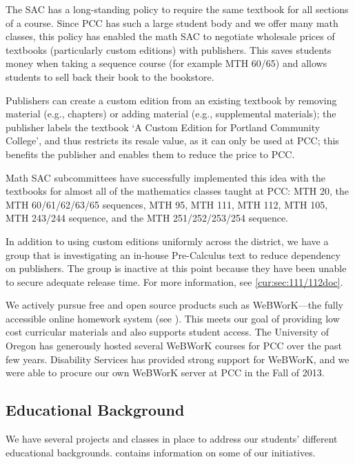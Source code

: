 The SAC has a long-standing policy to require the same textbook for all sections of a course. Since PCC has such a large student body and we offer many math classes, this policy has enabled the math SAC to negotiate wholesale prices of textbooks (particularly custom editions) with publishers.  This saves students money when taking a sequence course (for example MTH 60/65) and allows students to sell back their book to the bookstore.

Publishers can create a custom edition from an existing textbook by removing material (e.g., chapters) or adding material (e.g., supplemental materials); the publisher labels the textbook `A Custom Edition for Portland Community College', and thus restricts its resale value, as it can only be used at PCC; this benefits the publisher and enables them to reduce the price to PCC.  

Math SAC subcommittees have successfully implemented this idea with the textbooks for almost all of the mathematics classes taught at PCC: MTH 20, the MTH 60/61/62/63/65 sequences, MTH 95, MTH 111, MTH 112, MTH 105, MTH 243/244 sequence, and the MTH 251/252/253/254 sequence.

In addition to using custom editions uniformly across the district, we have a group that is investigating an in-house Pre-Calculus text to reduce dependency on publishers. The group is inactive at this point because they have been unable to secure adequate release time. For more information, see \cref{cur:sec:111/112doc}.

We actively pursue free and open source products such as WeBWorK---the fully accessible online homework system (see ). This meets our goal of providing low cost curricular materials and also supports student access. The University of Oregon has generously hosted several WeBWorK courses for PCC over the past few years.  Disability Services has provided strong support for WeBWorK, and we were able to procure our own WeBWorK server at PCC in the Fall of 2013.

\subsection{Educational Background}
We have several projects and classes in place to address our students' different educational backgrounds.  contains information on some of our initiatives.

